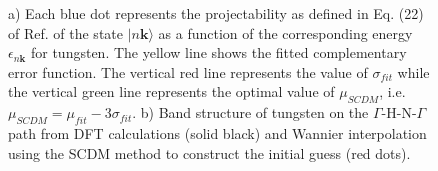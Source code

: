 \documentclass[a4paper,11pt,twoside]{article}
\begin{document}
\begin{figure}
\centering
{}
\caption{ a) Each blue dot represents the projectability as defined in Eq. (22) of Ref. \cite{Vitale2019automated}  of the state
$\vert n\mathbf{k} \rangle$ as a function of the corresponding energy $\epsilon_{n\mathbf{k}}$ for tungsten. The yellow line shows the fitted complementary error function. The vertical red line represents the value of $\sigma_{fit}$ while the vertical green line represents the optimal value of $\mu_{SCDM}$, i.e. $\mu_{SCDM} = \mu_{fit} - 3\sigma_{fit}$. b) Band structure of tungsten on the $\Gamma$-H-N-$\Gamma$ path from DFT calculations (solid black) and Wannier interpolation using the SCDM method to construct the initial guess (red dots).}
\label{fig:W_fit}
\end{figure}




\end{document}
